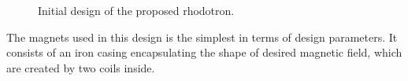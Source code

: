 \documentclass[a4paper,oneside,12pt]{report}
\numberwithin{equation}{chapter}
\begin{document}
\vspace{20pt}
\begin{figure}[H]
    \centering
    \qquad{}%
    \vspace{20pt}
    \caption{\centering Initial design of the proposed rhodotron.} 
    \label{fig:initial_design_cross_section}
\end{figure}
The magnets used in this design is the simplest in terms of design parameters. It consists of an iron casing encapsulating the shape of desired magnetic field, which are created by two coils inside.
\end{document}
